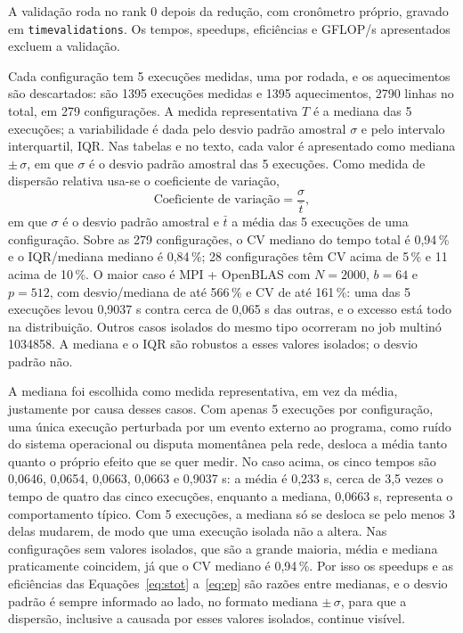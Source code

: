 \documentclass[Portugues]{ic-tese-v3}
\DeclareRobustCommand{\_}{\textunderscore\allowbreak} %
\begin{document}
A validação roda no rank 0 depois da redução, com cronômetro próprio, gravado em \texttt{time\_validation\_s}. Os tempos, speedups, eficiências e GFLOP/s apresentados excluem a validação.

Cada configuração tem 5 execuções medidas, uma por rodada, e os aquecimentos são descartados: são 1395 execuções medidas e 1395 aquecimentos, 2790 linhas no total, em 279 configurações. A medida representativa $T$ é a mediana das 5 execuções; a variabilidade é dada pelo desvio padrão amostral $\sigma$ e pelo intervalo interquartil, IQR. Nas tabelas e no texto, cada valor é apresentado como mediana $\pm\,\sigma$, em que $\sigma$ é o desvio padrão amostral das 5 execuções. Como medida de dispersão relativa usa-se o coeficiente de variação,
\begin{equation}\label{eq:cv}
\text{Coeficiente de variação} = \frac{\sigma}{\bar{t}},
\end{equation}
em que $\sigma$ é o desvio padrão amostral e $\bar{t}$ a média das 5 execuções de uma configuração. Sobre as 279 configurações, o CV mediano do tempo total é 0,94\,\% e o IQR/mediana mediano é 0,84\,\%; 28 configurações têm CV acima de 5\,\% e 11 acima de 10\,\%. O maior caso é MPI + OpenBLAS com $N=2000$, $b=64$ e $p=512$, com desvio/mediana de até 566\,\% e CV de até 161\,\%: uma das 5 execuções levou 0,9037 s contra cerca de 0,065 s das outras, e o excesso está todo na distribuição. Outros casos isolados do mesmo tipo ocorreram no job multinó 1034858. A mediana e o IQR são robustos a esses valores isolados; o desvio padrão não.

A mediana foi escolhida como medida representativa, em vez da média, justamente por causa desses casos. Com apenas 5 execuções por configuração, uma única execução perturbada por um evento externo ao programa, como ruído do sistema operacional ou disputa momentânea pela rede, desloca a média tanto quanto o próprio efeito que se quer medir. No caso acima, os cinco tempos são 0,0646, 0,0654, 0,0663, 0,0663 e 0,9037 s: a média é 0,233 s, cerca de 3,5 vezes o tempo de quatro das cinco execuções, enquanto a mediana, 0,0663 s, representa o comportamento típico. Com 5 execuções, a mediana só se desloca se pelo menos 3 delas mudarem, de modo que uma execução isolada não a altera. Nas configurações sem valores isolados, que são a grande maioria, média e mediana praticamente coincidem, já que o CV mediano é 0,94\,\%. Por isso os speedups e as eficiências das Equações~\eqref{eq:stot} a~\eqref{eq:ep} são razões entre medianas, e o desvio padrão é sempre informado ao lado, no formato mediana $\pm\,\sigma$, para que a dispersão, inclusive a causada por esses valores isolados, continue visível.
\end{document}
